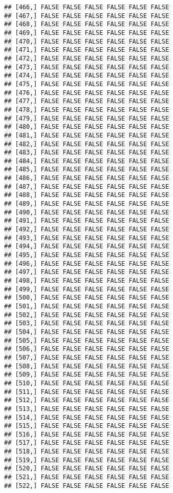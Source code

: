 \documentclass[
]{article}
\begin{document}
\begin{verbatim}
## [466,] FALSE FALSE FALSE FALSE FALSE FALSE
## [467,] FALSE FALSE FALSE FALSE FALSE FALSE
## [468,] FALSE FALSE FALSE FALSE FALSE FALSE
## [469,] FALSE FALSE FALSE FALSE FALSE FALSE
## [470,] FALSE FALSE FALSE FALSE FALSE FALSE
## [471,] FALSE FALSE FALSE FALSE FALSE FALSE
## [472,] FALSE FALSE FALSE FALSE FALSE FALSE
## [473,] FALSE FALSE FALSE FALSE FALSE FALSE
## [474,] FALSE FALSE FALSE FALSE FALSE FALSE
## [475,] FALSE FALSE FALSE FALSE FALSE FALSE
## [476,] FALSE FALSE FALSE FALSE FALSE FALSE
## [477,] FALSE FALSE FALSE FALSE FALSE FALSE
## [478,] FALSE FALSE FALSE FALSE FALSE FALSE
## [479,] FALSE FALSE FALSE FALSE FALSE FALSE
## [480,] FALSE FALSE FALSE FALSE FALSE FALSE
## [481,] FALSE FALSE FALSE FALSE FALSE FALSE
## [482,] FALSE FALSE FALSE FALSE FALSE FALSE
## [483,] FALSE FALSE FALSE FALSE FALSE FALSE
## [484,] FALSE FALSE FALSE FALSE FALSE FALSE
## [485,] FALSE FALSE FALSE FALSE FALSE FALSE
## [486,] FALSE FALSE FALSE FALSE FALSE FALSE
## [487,] FALSE FALSE FALSE FALSE FALSE FALSE
## [488,] FALSE FALSE FALSE FALSE FALSE FALSE
## [489,] FALSE FALSE FALSE FALSE FALSE FALSE
## [490,] FALSE FALSE FALSE FALSE FALSE FALSE
## [491,] FALSE FALSE FALSE FALSE FALSE FALSE
## [492,] FALSE FALSE FALSE FALSE FALSE FALSE
## [493,] FALSE FALSE FALSE FALSE FALSE FALSE
## [494,] FALSE FALSE FALSE FALSE FALSE FALSE
## [495,] FALSE FALSE FALSE FALSE FALSE FALSE
## [496,] FALSE FALSE FALSE FALSE FALSE FALSE
## [497,] FALSE FALSE FALSE FALSE FALSE FALSE
## [498,] FALSE FALSE FALSE FALSE FALSE FALSE
## [499,] FALSE FALSE FALSE FALSE FALSE FALSE
## [500,] FALSE FALSE FALSE FALSE FALSE FALSE
## [501,] FALSE FALSE FALSE FALSE FALSE FALSE
## [502,] FALSE FALSE FALSE FALSE FALSE FALSE
## [503,] FALSE FALSE FALSE FALSE FALSE FALSE
## [504,] FALSE FALSE FALSE FALSE FALSE FALSE
## [505,] FALSE FALSE FALSE FALSE FALSE FALSE
## [506,] FALSE FALSE FALSE FALSE FALSE FALSE
## [507,] FALSE FALSE FALSE FALSE FALSE FALSE
## [508,] FALSE FALSE FALSE FALSE FALSE FALSE
## [509,] FALSE FALSE FALSE FALSE FALSE FALSE
## [510,] FALSE FALSE FALSE FALSE FALSE FALSE
## [511,] FALSE FALSE FALSE FALSE FALSE FALSE
## [512,] FALSE FALSE FALSE FALSE FALSE FALSE
## [513,] FALSE FALSE FALSE FALSE FALSE FALSE
## [514,] FALSE FALSE FALSE FALSE FALSE FALSE
## [515,] FALSE FALSE FALSE FALSE FALSE FALSE
## [516,] FALSE FALSE FALSE FALSE FALSE FALSE
## [517,] FALSE FALSE FALSE FALSE FALSE FALSE
## [518,] FALSE FALSE FALSE FALSE FALSE FALSE
## [519,] FALSE FALSE FALSE FALSE FALSE FALSE
## [520,] FALSE FALSE FALSE FALSE FALSE FALSE
## [521,] FALSE FALSE FALSE FALSE FALSE FALSE
## [522,] FALSE FALSE FALSE FALSE FALSE FALSE

\end{verbatim}
\end{document}
